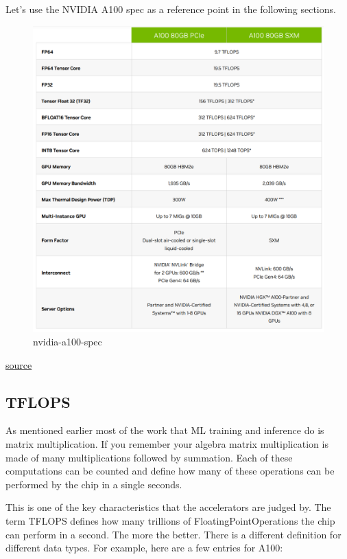 \documentclass[
]{report}
\begin{document}
Let's use the NVIDIA A100 spec as a reference point in the following
sections.

\begin{figure}[H]

{\centering \includegraphics{images/nvidia-a100-spec.png}

}

\caption{nvidia-a100-spec}

\end{figure}%

\href{https://www.nvidia.com/en-us/data-center/a100/}{source}

\subsection{TFLOPS}\label{tflops}

As mentioned earlier most of the work that ML training and inference do
is matrix multiplication. If you remember your algebra matrix
multiplication is made of many multiplications followed by summation.
Each of these computations can be counted and define how many of these
operations can be performed by the chip in a single seconds.

This is one of the key characteristics that the accelerators are judged
by. The term TFLOPS defines how many trillions of
FloatingPointOperations the chip can perform in a second. The more the
better. There is a different definition for different data types. For
example, here are a few entries for A100:
\end{document}
